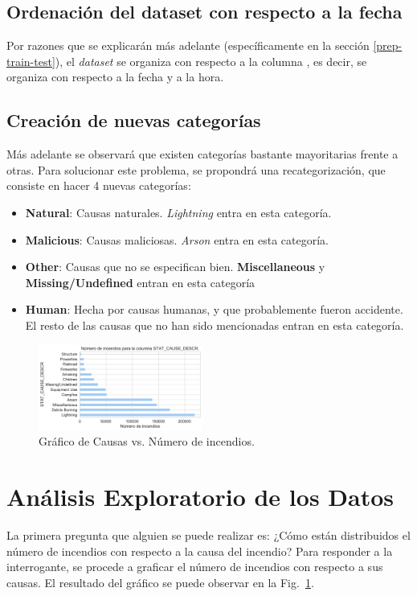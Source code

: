 \subsection{Ordenación del dataset con respecto a la fecha}\label{ord-cr-fecha}
Por razones que se explicarán más adelante (específicamente en la sección \ref{prep-train-test}), el \textit{dataset} se organiza con respecto a la columna , es decir, se organiza con respecto a la fecha y a la hora.

\subsection{Creación de nuevas categorías}\label{subsec:nuevas-cats}
Más adelante se observará que existen categorías bastante mayoritarias frente a otras. Para solucionar este problema, se propondrá una recategorización, que consiste en hacer 4 nuevas categorías:
\begin{itemize}
    \item \textbf{Natural}: Causas naturales. \textit{Lightning} entra en esta categoría.
    \item \textbf{Malicious}: Causas maliciosas. \textit{Arson} entra en esta categoría.
    \item \textbf{Other}: Causas que no se especifican bien. \textbf{Miscellaneous} y \textbf{Missing/Undefined} entran en esta categoría
    \item \textbf{Human}: Hecha por causas humanas, y que probablemente fueron accidente. El resto de las causas que no han sido mencionadas entran en esta categoría.
\end{itemize}

\begin{figure}[!t]
    \centering
    \includegraphics[width=0.48\textwidth]{imagenes/barh_STAT_CAUSE_DESCR.pdf}
    \caption{Gráfico de Causas vs. Número de incendios.}
    \label{fig:SCD}
\end{figure}
\section{Análisis Exploratorio de los Datos}\label{EDA}
La primera pregunta que alguien se puede realizar es: ¿Cómo están distribuidos el número de incendios con respecto a la causa del incendio? Para responder a la interrogante, se procede a graficar el número de incendios con respecto a sus causas. El resultado del gráfico se puede observar en la Fig.~\ref{fig:SCD}.

